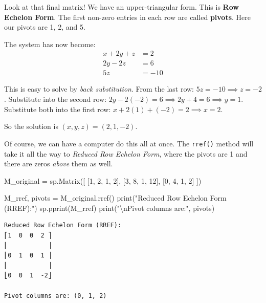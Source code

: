 \documentclass[
  letterpaper,
  DIV=11,
  numbers=noendperiod]{scrreprt}
\newenvironment{Shaded}{\begin{snugshade}}{\end{snugshade}}
\newcommand{\BuiltInTok}[1]{\textcolor[rgb]{0.00,0.23,0.31}{#1}}
\newcommand{\CharTok}[1]{\textcolor[rgb]{0.13,0.47,0.30}{#1}}
\newcommand{\DecValTok}[1]{\textcolor[rgb]{0.68,0.00,0.00}{#1}}
\newcommand{\NormalTok}[1]{\textcolor[rgb]{0.00,0.23,0.31}{#1}}
\newcommand{\OperatorTok}[1]{\textcolor[rgb]{0.37,0.37,0.37}{#1}}
\newcommand{\StringTok}[1]{\textcolor[rgb]{0.13,0.47,0.30}{#1}}
\begin{document}
Look at that final matrix! We have an upper-triangular form. This is
\textbf{Row Echelon Form}. The first non-zero entries in each row are
called \textbf{pivots}. Here our pivots are 1, 2, and 5.

The system has now become: \[
\begin{align*}
x + 2y + z &= 2 \\
2y - 2z &= 6 \\
5z &= -10
\end{align*}
\]

This is easy to solve by \emph{back substitution}. From the last row:
\(5z = -10 \implies z = -2\). Substitute into the second row:
\(2y - 2(-2) = 6 \implies 2y + 4 = 6 \implies y = 1\). Substitute both
into the first row: \(x + 2(1) + (-2) = 2 \implies x = 2\).

So the solution is \((x, y, z) = (2, 1, -2)\).

Of course, we can have a computer do this all at once. The
\texttt{rref()} method will take it all the way to \emph{Reduced Row
Echelon Form}, where the pivots are 1 and there are zeros \emph{above}
them as well.

\label{sympy-rref}
\begin{Shaded}
\begin{Highlighting}[]
\NormalTok{M\_original }\OperatorTok{=}\NormalTok{ sp.Matrix([}
\NormalTok{  [}\DecValTok{1}\NormalTok{, }\DecValTok{2}\NormalTok{, }\DecValTok{1}\NormalTok{,  }\DecValTok{2}\NormalTok{],}
\NormalTok{  [}\DecValTok{3}\NormalTok{, }\DecValTok{8}\NormalTok{, }\DecValTok{1}\NormalTok{, }\DecValTok{12}\NormalTok{],}
\NormalTok{  [}\DecValTok{0}\NormalTok{, }\DecValTok{4}\NormalTok{, }\DecValTok{1}\NormalTok{,  }\DecValTok{2}\NormalTok{]}
\NormalTok{])}

\NormalTok{M\_rref, pivots }\OperatorTok{=}\NormalTok{ M\_original.rref()}
\BuiltInTok{print}\NormalTok{(}\StringTok{"Reduced Row Echelon Form (RREF):"}\NormalTok{)}
\NormalTok{sp.pprint(M\_rref)}
\BuiltInTok{print}\NormalTok{(}\StringTok{"}\CharTok{\textbackslash{}n}\StringTok{Pivot columns are:"}\NormalTok{, pivots)}
\end{Highlighting}
\end{Shaded}

\begin{verbatim}
Reduced Row Echelon Form (RREF):
⎡1  0  0  2 ⎤
⎢           ⎥
⎢0  1  0  1 ⎥
⎢           ⎥
⎣0  0  1  -2⎦

Pivot columns are: (0, 1, 2)
\end{verbatim}
\end{document}
